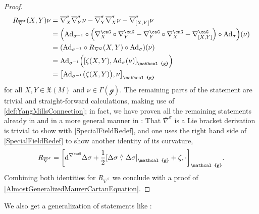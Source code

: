 \documentclass[reqno,a4paper,oneside]{amsart}
\theoremstyle{plain}
\theoremstyle{remark}
\theoremstyle{definition}
\begin{document}
\begin{proof}
\begin{align*}
R_{\overline{\nabla}^\sigma} (X, Y) \nu
&=
\overline{\nabla}^\sigma_X \overline{\nabla}^\sigma_Y \nu
	- \overline{\nabla}^\sigma_Y \overline{\nabla}^\sigma_X \nu
	- \overline{\nabla}^\sigma_{[X, Y]} \nu
\\
&=
\mleft(\mathrm{Ad}_{\sigma^{-1}} \circ \mleft( \nabla^\caG_X \circ \nabla^\caG_Y 
	- \nabla^\caG_Y \circ \nabla^\caG_X
	- \nabla^\caG_{[X, Y]} \mright) \circ \mathrm{Ad}_\sigma\mright) (\nu)
\\
&=
\mleft( \mathrm{Ad}_{\sigma^{-1}} \circ
	R_{\nabla^{\mathcal{G}}}(X, Y) \circ \mathrm{Ad}_{\sigma}
\mright) (\nu)
\\
&=
\mathrm{Ad}_{\sigma^{-1}}\mleft( \mleft[ \zeta(X, Y), \mathrm{Ad}_{\sigma}(\nu) \mright]_{\mathcal{g}} \mright)
\\
&=
\mleft[ \mathrm{Ad}_{\sigma^{-1}}\bigl(\zeta(X, Y)\bigr), \nu \mright]_{\mathcal{g}}
\end{align*}
for all $X, Y \in \mathfrak{X}(M)$ and $\nu \in \Gamma(\mathcal{g})$. The remaining parts of the statement are trivial and straight-forward calculations, making use of \ref{def:YangMillsConnection}; in fact, we have proven all the remaining statements already in \cite[\S 3, part of Thm.\ 3.6]{My1stpaper} and in a more general manner in \cite[\S 4.6, Thm.\ 4.6.9]{MyThesis}: That $\overline{\nabla}^\sigma$ is a Lie bracket derivation is trivial to show with \ref{SpecialFieldRedef}, and one uses the right hand side of \ref{SpecialFieldRedef} to show another identity of its curvature,
\begin{equation*}
R_{\overline{\nabla}^\sigma} 
=
\mleft[ \mathrm{d}^{\nabla^\caG} \Delta \sigma + \frac{1}{2} \mleft[ \Delta \sigma \stackrel{\wedge}{,} \Delta\sigma \mright]_{\mathcal{g}} + \zeta, \cdot \mright]_{\mathcal{g}}.
\end{equation*}
Combining both identities for $R_{\overline{\nabla}^\sigma}$ we conclude with a proof of \ref{AlmostGeneralizedMaurerCartanEquation}. 
\end{proof}

We also get a generalization of statements like \cite[\S 5.5, Lemma 5.5.5, page 276]{Hamilton}:
\end{document}
